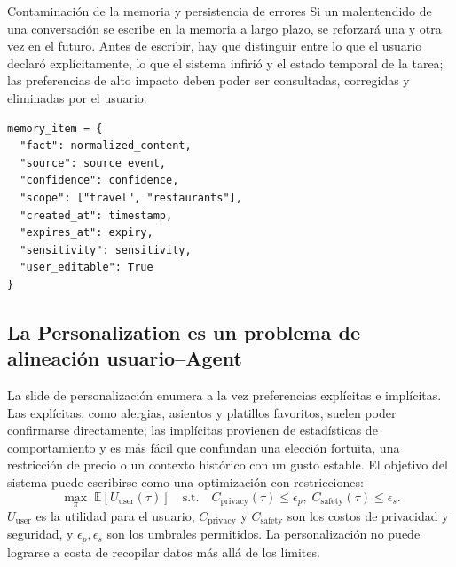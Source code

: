 \begin{warningbox}{Contaminación de la memoria y persistencia de errores}
Si un malentendido de una conversación se escribe en la memoria a largo plazo, se reforzará una y otra vez en el futuro. Antes de escribir, hay que distinguir entre lo que el usuario declaró explícitamente, lo que el sistema infirió y el estado temporal de la tarea; las preferencias de alto impacto deben poder ser consultadas, corregidas y eliminadas por el usuario.
\end{warningbox}

\begin{lstlisting}[caption={Registro de memoria con fuente y política de caducidad}]
memory_item = {
  "fact": normalized_content,
  "source": source_event,
  "confidence": confidence,
  "scope": ["travel", "restaurants"],
  "created_at": timestamp,
  "expires_at": expiry,
  "sensitivity": sensitivity,
  "user_editable": True
}
\end{lstlisting}

\subsection{La Personalization es un problema de alineación usuario--Agent}

La slide de personalización enumera a la vez preferencias explícitas e implícitas. Las explícitas, como alergias, asientos y platillos favoritos, suelen poder confirmarse directamente; las implícitas provienen de estadísticas de comportamiento y es más fácil que confundan una elección fortuita, una restricción de precio o un contexto histórico con un gusto estable. El objetivo del sistema puede escribirse como una optimización con restricciones:
\[
\max_\pi\;\mathbb{E}[U_{\text{user}}(\tau)]
\quad\text{s.t.}\quad
C_{\text{privacy}}(\tau)\le \epsilon_p,
\;C_{\text{safety}}(\tau)\le \epsilon_s.
\]
$U_{\text{user}}$ es la utilidad para el usuario, $C_{\text{privacy}}$ y $C_{\text{safety}}$ son los costos de privacidad y seguridad, y $\epsilon_p,\epsilon_s$ son los umbrales permitidos. La personalización no puede lograrse a costa de recopilar datos más allá de los límites.



